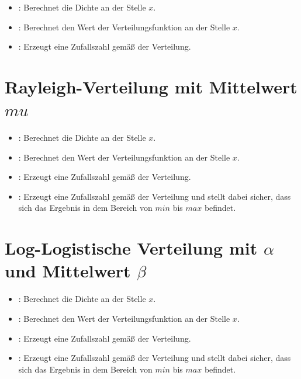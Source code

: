 \begin{itemize}

\item
{}:
Berechnet die Dichte an der Stelle $x$.

\item
{}:
Berechnet den Wert der Verteilungsfunktion an der Stelle $x$.

\item
{}:
Erzeugt eine Zufallszahl gemäß der Verteilung.

\end{itemize}



\section{Rayleigh-Verteilung mit Mittelwert \texorpdfstring{$mu$}{mu}}

\begin{itemize}

\item
{}:
Berechnet die Dichte an der Stelle $x$.

\item
{}:
Berechnet den Wert der Verteilungsfunktion an der Stelle $x$.

\item
{}:
Erzeugt eine Zufallszahl gemäß der Verteilung.

\item
{}:
Erzeugt eine Zufallszahl gemäß der Verteilung und stellt dabei sicher, dass sich das Ergebnis in dem Bereich von $min$ bis $max$ befindet.

\end{itemize}



\section{Log-Logistische Verteilung mit \texorpdfstring{$\alpha$}{alpha} und Mittelwert \texorpdfstring{$\beta$}{beta}}

\begin{itemize}

\item
{}:
Berechnet die Dichte an der Stelle $x$.

\item
{}:
Berechnet den Wert der Verteilungsfunktion an der Stelle $x$.

\item
{}:
Erzeugt eine Zufallszahl gemäß der Verteilung.

\item
{}:
Erzeugt eine Zufallszahl gemäß der Verteilung und stellt dabei sicher, dass sich das Ergebnis in dem Bereich von $min$ bis $max$ befindet.

\end{itemize}



